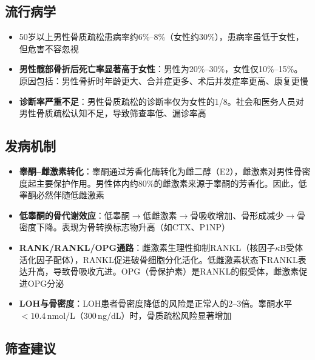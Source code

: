 \documentclass[12pt,a4paper,twoside]{ctexbook}
\begin{document}
\subsection{流行病学}

\begin{itemize}[leftmargin=2cm]
	\item 50岁以上男性骨质疏松患病率约6\%--8\%（女性约30\%），患病率虽低于女性，但危害不容忽视
	\item \textbf{男性髋部骨折后死亡率显著高于女性}：男性为20\%--30\%，女性仅10\%--15\%。原因包括：男性骨折时年龄更大、合并症更多、术后并发症率更高、康复更慢
	\item \textbf{诊断率严重不足}：男性骨质疏松的诊断率仅为女性的1/8。社会和医务人员对男性骨质疏松认知不足，导致筛查率低、漏诊率高
\end{itemize}

\subsection{发病机制}

\begin{itemize}[leftmargin=2cm]
	\item \textbf{睾酮--雌激素转化}：睾酮通过芳香化酶转化为雌二醇（E2），雌激素对男性骨密度起主要保护作用。男性体内约80\%的雌激素来源于睾酮的芳香化。因此，低睾酮必然伴随低雌激素
	\item \textbf{低睾酮的骨代谢效应}：低睾酮$\rightarrow$低雌激素$\rightarrow$骨吸收增加、骨形成减少$\rightarrow$骨密度下降。表现为骨转换标志物升高（如CTX、P1NP）
	\item \textbf{RANK/RANKL/OPG通路}：雌激素生理性抑制RANKL（核因子$\kappa$B受体活化因子配体），RANKL促进破骨细胞分化活化。低雌激素状态下RANKL表达升高，导致骨吸收亢进。OPG（骨保护素）是RANKL的假受体，雌激素促进OPG分泌
	\item \textbf{LOH与骨密度}：LOH患者骨密度降低的风险是正常人的2--3倍。睾酮水平$<10.4\,$nmol/L（300\,ng/dL）时，骨质疏松风险显著增加
\end{itemize}

\subsection{筛查建议}
\end{document}

